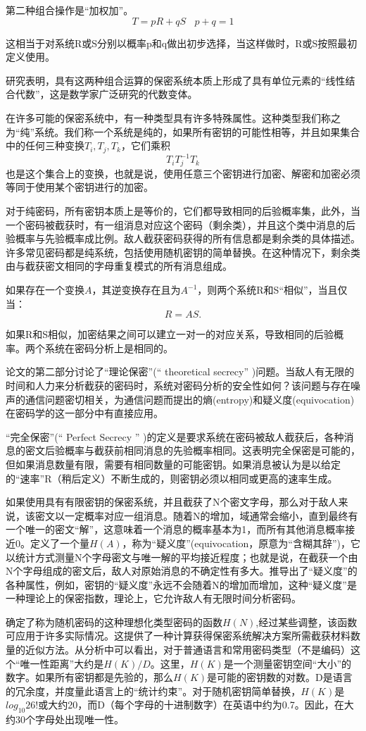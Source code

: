 \documentclass[]{article}
\begin{document}
第二种组合操作是“加权加”。\[T=pR+qS \ \ \ \  p+q=1\]

这相当于对系统R或S分别以概率p和q做出初步选择，当这样做时，R或S按照最初定义使用。


研究表明，具有这两种组合运算的保密系统本质上形成了具有单位元素的“线性结合代数”，这是数学家广泛研究的代数变体。


在许多可能的保密系统中，有一种类型具有许多特殊属性。这种类型我们称之为“纯”系统。我们称一个系统是纯的，如果所有密钥的可能性相等，并且如果集合中的任何三种变换$T_i,T_j,T_k$，它们乘积	
\[T_iT^{-1}_jT_k\]
也是这个集合上的变换，也就是说，使用任意三个密钥进行加密、解密和加密必须等同于使用某个密钥进行的加密。
	
对于纯密码，所有密钥本质上是等价的，它们都导致相同的后验概率集，此外，当一个密码被截获时，有一组消息对应这个密码（剩余类），并且这个类中消息的后验概率与先验概率成比例。敌人截获密码获得的所有信息都是剩余类的具体描述。许多常见密码都是纯系统，包括使用随机密钥的简单替换。在这种情况下，剩余类由与截获密文相同的字母重复模式的所有消息组成。

如果存在一个变换$A$，其逆变换存在且为$A^{-1}$，则两个系统R和S“相似”，当且仅当：
\[R=AS.\]

如果R和S相似，加密结果之间可以建立一对一的对应关系，导致相同的后验概率。两个系统在密码分析上是相同的。


论文的第二部分讨论了“理论保密”(“ theoretical secrecy” )问题。当敌人有无限的时间和人力来分析截获的密码时，系统对密码分析的安全性如何？该问题与存在噪声的通信问题密切相关，为通信问题而提出的熵(entropy)和疑义度(equivocation)在密码学的这一部分中有直接应用。


“完全保密”(“ Perfect Secrecy ” )的定义是要求系统在密码被敌人截获后，各种消息的密文后验概率与截获前相同消息的先验概率相同。这表明完全保密是可能的，但如果消息数量有限，需要有相同数量的可能密钥。如果消息被认为是以给定的“速率”R（稍后定义）不断生成的，则密钥必须以相同或更高的速率生成。


如果使用具有有限密钥的保密系统，并且截获了N个密文字母，那么对于敌人来说，该密文以一定概率对应一组消息。随着N的增加，域通常会缩小，直到最终有一个唯一的密文“解”，这意味着一个消息的概率基本为1，而所有其他消息概率接近0。定义了一个量$H(A)$，称为“疑义度”(equivocation，原意为“含糊其辞”)，它以统计方式测量N个字母密文与唯一解的平均接近程度；也就是说，在截获一个由N个字母组成的密文后，敌人对原始消息的不确定性有多大。推导出了“疑义度”的各种属性，例如，密钥的“疑义度”永远不会随着N的增加而增加，这种“疑义度”是一种理论上的保密指数，理论上，它允许敌人有无限时间分析密码。


确定了称为随机密码的这种理想化类型密码的函数$H(N)$,经过某些调整，该函数可应用于许多实际情况。这提供了一种计算获得保密系统解决方案所需截获材料数量的近似方法。从分析中可以看出，对于普通语言和常用密码类型（不是编码）这个“唯一性距离”大约是$H(K)/D$。这里，$H(K)$是一个测量密钥空间“大小”的数字。如果所有密钥都是先验的，那么$H(K)$是可能的密钥数的对数。D是语言的冗余度，并度量此语言上的“统计约束”。对于随机密钥简单替换，$H(K)$是$log_{10}26!$或大约20，而D（每个字母的十进制数字）在英语中约为0.7。因此，在大约30个字母处出现唯一性。
\end{document}
